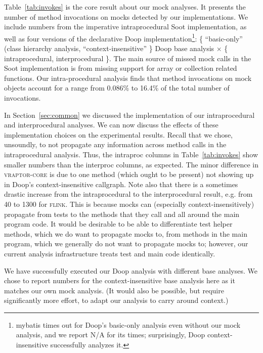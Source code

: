 Table~\ref{tab:invokes} is the core result about our mock analyses. It presents the number of method invocations on mocks detected by our implementations. We include numbers from the imperative intraprocedural Soot implementation, as well as four versions of the declarative Doop implementation\footnote{mybatis times out for Doop's basic-only analysis even without our mock analysis, and we report N/A for its times; surprisingly, Doop context-insensitive successfully analyzes it.}: \{ ``basic-only'' (class hierarchy analysis, ``context-insensitive'' \} Doop base analysis $\times$ \{ intraprocedural, interprocedural \}. The main source of missed mock calls in the Soot implementation is from missing support for array or collection related functions. Our intra-procedural analysis finds that method invocations on mock objects account for a range from 0.086\% to 16.4\% of the total number of invocations. 


In Section~\ref{sec:common} we discussed the implementation of our intraprocedural and interprocedural analyses. We can now discuss the effects of these implementation choices on the experimental results. Recall that we chose, unsoundly, to not propagate any information across method calls in the intraprocedural analysis. Thus, the intraproc columns in Table~\ref{tab:invokes} show smaller numbers than the interproc columns, as expected. The minor difference in \textsc{vraptor-core} is due to one method (which ought to be present) not showing up in Doop's context-insensitive callgraph. Note also that there is a sometimes drastic increase from the intraprocedural to the interprocedural result, e.g. from 40 to 1300 for \textsc{flink}. This is because mocks can (especially context-insensitively) propagate from tests to the methods that they call and all around the main program code. It would be desirable to be able to differentiate test helper methods, which we do want to propagate mocks to, from methods in the main program, which we generally do not want to propagate mocks to; however, our current analysis infrastructure treats test and main code identically.

We have successfully executed our Doop analysis with different base analyses. We chose to report numbers for the context-insensitive base analysis here as it matches our own mock analysis. (It would also be possible, but require significantly more effort, to adapt our analysis to carry around context.)

